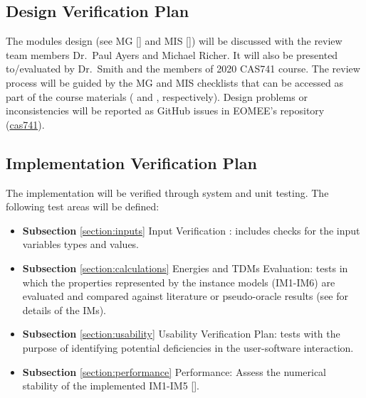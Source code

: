 \documentclass[12pt, titlepage]{article}
\begin{document}
\subsection{Design Verification Plan}

The modules design (see MG [\cite{MG2020}] and MIS [\cite{MIS2020}]) will be 
discussed with the review team members Dr.\ Paul Ayers and Michael Richer. It 
will also be presented to/evaluated by Dr.\ Smith and the members of 2020 
CAS741 course. The review process will be guided by the MG and MIS checklists  
that can be accessed as part of the course materials (\cite{mgcheck} and 
\cite{mischeck}, respectively). Design problems or inconsistencies will be 
reported as GitHub 
issues in EOMEE's repository 
(\href{https://github.com/gabrielasd/eomee/tree/cas741} 
{cas741}).

\subsection{Implementation Verification Plan}

%
The implementation will be verified through system and unit testing. The 
following test areas will be defined:
\begin{itemize}
	\item \textbf{Subsection} \ref{section:inputs} Input Verification : 
	includes checks for the input variables types and values.
	
	\item \textbf{Subsection} 
	\ref{section:calculations} Energies and TDMs Evaluation: tests in 
	which the properties represented by the instance models (IM1-IM6) are 
	evaluated and compared against literature or pseudo-oracle results (see 
	\cite{SRS2020} for details of the IMs).
	
	\item \textbf{Subsection} \ref{section:usability} Usability Verification 
	Plan: tests with the purpose of identifying potential deficiencies in the 
	user-software interaction.
	
	\item \textbf{Subsection} \ref{section:performance} Performance: Assess the 
	numerical stability of the implemented IM1-IM5 [\cite{SRS2020}].
\end{itemize}
\end{document}
